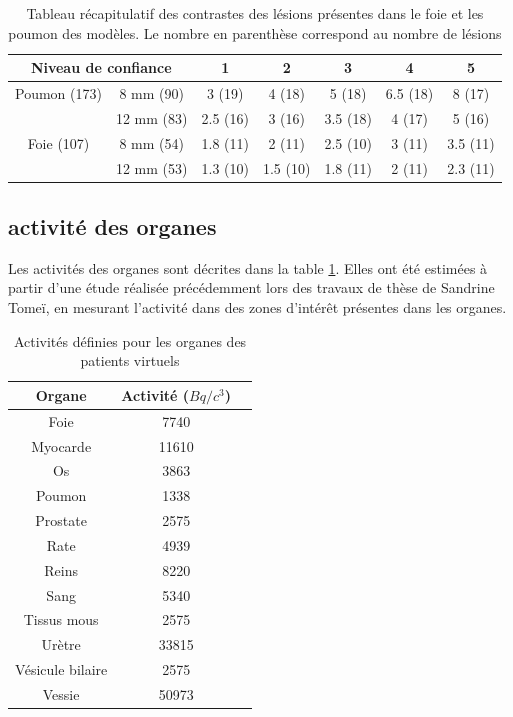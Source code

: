 \begin{table}
\centering
 \begin{tabular}{|c|c||c|c|c|c|c|} 
\hline
\multicolumn{2}{|c|}{Niveau de confiance}       & 1	  & 2	    & 3	     & 4	& 5	\\
\hline
\hline
Poumon	(173)	& 8 mm (90)	& 3 (19)  & 4 (18)  & 5 (18)  & 6.5 (18)	& 8 (17)\\
\cline{2-7}
		& 12 mm	(83)	& 2.5 (16)& 3 (16)  & 3.5 (18)& 4 (17)	& 5 (16)\\
\hline
Foie 	(107)	& 8 mm (54)		& 1.8 (11)& 2 (11)  & 2.5 (10)& 3 (11)	& 3.5 (11)\\
\cline{2-7}
		& 12 mm	(53)	& 1.3 (10)& 1.5 (10)& 1.8 (11)& 2 (11)  & 2.3 (11)\\
\hline 
 \end{tabular}

\caption[Tableau récapitulatif des lésions]{Tableau récapitulatif des contrastes des lésions présentes dans le foie et les poumon des modèles. Le nombre en parenthèse correspond au nombre de lésions}
\label{tab:contrastePoumonFoieRecap}


\end{table}

\subsection{activité des organes}


Les activités des organes sont décrites dans la table \ref{tab:contrastePoumonFoieRecap}. Elles ont été estimées à partir d'une étude réalisée précédemment lors des travaux de thèse de Sandrine Tomeï, en mesurant l'activité dans des zones d'intérêt présentes dans les organes.

\begin{table}
\centering
 \begin{tabular}{|c|c|c|} 
\hline
Organe 		& Activité ($Bq/c^3$) \\
\hline
\hline
Foie		& 7740		       \\
\hline
Myocarde	& 11610		       \\
\hline
Os		& 3863		       \\
\hline
Poumon 		& 1338 		       \\
\hline
Prostate	& 2575		       \\
\hline
Rate		& 4939		       \\
\hline
Reins		& 8220		       \\
\hline
Sang		& 5340		       \\
\hline
Tissus mous 	& 2575 		       \\
\hline
Urètre		& 33815		       \\
\hline
Vésicule bilaire& 2575		       \\
\hline
Vessie		& 50973		       \\
\hline
 \end{tabular}

\caption[Activités des organes des patients de la base de donnée]{Activités définies pour les organes des patients virtuels}
\label{tab:activiteOrganes}
\end{table}

